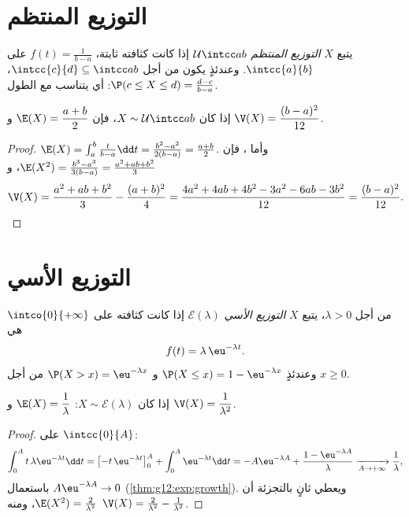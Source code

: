 \section{التوزيع المنتظم}

\begin{definition}\label{def:g12:contdist:uniform}
يتبع $X$ \emph{التوزيع المنتظم}
$\mathcal U\intcc ab$ إذا كانت كثافته ثابتة،
$f(t) = \frac{1}{b-a}$ على $\intcc{a}{b}$. وعندئذٍ يكون من أجل
$\intcc{c}{d} \subseteq \intcc ab$،
$\P(c \leq X \leq d) = \frac{d - c}{b - a}$: أي  يتناسب مع
الطول.
\end{definition}

\begin{proposition}\label{prop:g12:contdist:uniformmoments}
إذا كان $X \sim \mathcal U\intcc ab$، فإن
$\E(X) = \dfrac{a+b}{2}$ و $\V(X) = \dfrac{(b-a)^2}{12}$.
\end{proposition}

\begin{proof}
$\E(X) = \int_a^b \frac{t}{b-a}\dd t
= \frac{b^2 - a^2}{2(b-a)} = \frac{a+b}{2}$. وأما ، فإن
$\E(X^2) = \frac{b^3 - a^3}{3(b-a)} = \frac{a^2 + ab + b^2}{3}$، و
\[
\V(X) = \frac{a^2 + ab + b^2}{3} - \frac{(a+b)^2}{4}
= \frac{4a^2 + 4ab + 4b^2 - 3a^2 - 6ab - 3b^2}{12}
= \frac{(b - a)^2}{12}. \qedhere
\]
\end{proof}

\section{التوزيع الأسي}

\begin{definition}\label{def:g12:contdist:expo}
من أجل $\lambda > 0$، يتبع $X$ \emph{التوزيع
الأسي} $\mathcal E(\lambda)$ إذا كانت
كثافته على $\intco{0}{+\infty}$ هي
\[
f(t) = \lambda\,\eu^{-\lambda t}.
\]
وعندئذٍ $\P(X \leq x) = 1 - \eu^{-\lambda x}$ و
$\P(X > x) = \eu^{-\lambda x}$ من أجل $x \geq 0$.
\end{definition}

\begin{proposition}\label{prop:g12:contdist:expomoments}
إذا كان $X \sim \mathcal E(\lambda)$:
$\E(X) = \dfrac{1}{\lambda}$ و $\V(X) = \dfrac{1}{\lambda^2}$.
\end{proposition}

\begin{proof}
 على $\intcc{0}{A}$:
\[
\int_0^A t\,\lambda\eu^{-\lambda t}\dd t
= \bigl[-t\,\eu^{-\lambda t}\bigr]_0^A + \int_0^A \eu^{-\lambda t}\dd t
= -A\eu^{-\lambda A} + \frac{1 - \eu^{-\lambda A}}{\lambda}
\xrightarrow[A\to+\infty]{} \frac1\lambda,
\]
باستعمال $A\eu^{-\lambda A} \to 0$ (\cref{thm:g12:exp:growth}). ويعطي 
ثانٍ بالتجزئة أن $\E(X^2) = \frac{2}{\lambda^2}$، ومنه
$\V(X) = \frac{2}{\lambda^2} - \frac{1}{\lambda^2}$.
\end{proof}

